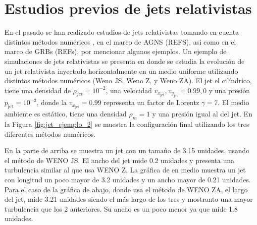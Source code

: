 \documentclass[12pt,a4paper]{book}
\begin{document}
  
  
\section{Estudios previos de jets relativistas}

En el pasado se han realizado estudios de jets relativistas tomando en cuenta distintos métodos numéricos \cite{SURJ-I, MB-HLLC-I}, en el marco de AGNS (REFS), así como en el marco de GRBs (REFs), 
por mencionar algunos ejemplos. Un ejemplo de simulaciones de jets relativistas se presenta en \cite{SURJ-I} donde se estudia la evolución de un jet relativista inyectado horizontalmente en un medio 
uniforme utilizando distintos métodos numéricos (Weno JS, Weno Z, y Weno ZA). El jet el cilíndrico, tiene una densidad de $\rho_{jet} = 10^{-2}$, una velocidad $v_{x_{\text{jet}}},v_{y_{\text{jet}}} = 0.99, 0$ y 
una presión $p_{\text{jet}} = 10^{-3}$, donde la $v_{x_{\text{jet}}} = 0.99$ representa un factor de Lorentz $\gamma = 7$. El medio ambiente es estático, tiene una densidad $\rho_m = 1$ y una presión igual al del jet. 
En la Figura \ref{fig:jet_ejemplo_2} se muestra la configuración final utilizando los tres diferentes métodos numéricos.

{\color{blue} En la parte  de arriba se muestra un jet con un tamaño de 3.15 unidades, usando el método de WENO JS. El ancho del jet mide 0.2 unidades y presenta una turbulencia similar al que usa WENO Z.
La gráfica de en medio muestra un jet con longitud un poco mayor de 3.2 unidades y un ancho mayor de 0.21 unidades. Para el caso de la gráfica de abajo, donde usa el método de WENO ZA, el largo del jet, mide 3.21 unidades
siendo el más largo de los tres  y mostranto una mayor turbulencia que los 2 anteriores. Su ancho es un poco menor ya que mide 1.8 unidades. }
\end{document}
